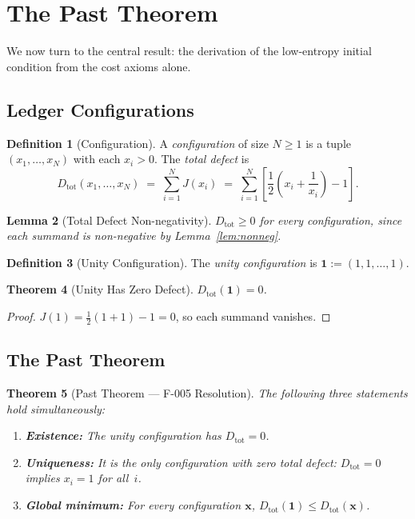 \documentclass[12pt,a4paper]{article}
\newtheorem{theorem}{Theorem}[section]
\newtheorem{lemma}[theorem]{Lemma}
\theoremstyle{definition}
\newtheorem{definition}[theorem]{Definition}
\theoremstyle{remark}
\begin{document}
\section{The Past Theorem}
\label{sec:past}

We now turn to the central result: the derivation of the low-entropy
initial condition from the cost axioms alone.

\subsection{Ledger Configurations}

\begin{definition}[Configuration]
\label{def:config}
A \emph{configuration} of size $N \geq 1$ is a tuple $(x_1, \ldots, x_N)$
with each $x_i > 0$.  The \emph{total defect} is
\[
  D_{\mathrm{tot}}(x_1, \ldots, x_N) \;=\;
  \sum_{i=1}^{N} J(x_i)
  \;=\;
  \sum_{i=1}^{N} \left[\frac{1}{2}\!\left(x_i + \frac{1}{x_i}\right) - 1\right].
\]
\end{definition}

\begin{lemma}[Total Defect Non-negativity]
\label{lem:total-nonneg}
$D_{\mathrm{tot}} \geq 0$ for every configuration, since each summand is
non-negative by Lemma~\ref{lem:nonneg}.
\end{lemma}

\begin{definition}[Unity Configuration]
\label{def:unity}
The \emph{unity configuration} is $\mathbf{1} := (1, 1, \ldots, 1)$.
\end{definition}

\begin{theorem}[Unity Has Zero Defect]
\label{thm:unity-zero}
$D_{\mathrm{tot}}(\mathbf{1}) = 0$.
\end{theorem}

\begin{proof}
$J(1) = \tfrac{1}{2}(1 + 1) - 1 = 0$, so each summand vanishes.
\end{proof}

\subsection{The Past Theorem}

\begin{theorem}[Past Theorem --- F-005 Resolution]
\label{thm:past}
The following three statements hold simultaneously:
\begin{enumerate}[label=(\roman*)]
  \item \textbf{Existence:} The unity configuration has $D_{\mathrm{tot}}
    = 0$.
  \item \textbf{Uniqueness:} It is the \emph{only} configuration with
    zero total defect: $D_{\mathrm{tot}} = 0$ implies $x_i = 1$ for
    all~$i$.
  \item \textbf{Global minimum:} For every configuration $\mathbf{x}$,
    $D_{\mathrm{tot}}(\mathbf{1}) \leq D_{\mathrm{tot}}(\mathbf{x})$.
\end{enumerate}
\end{theorem}
\end{document}
